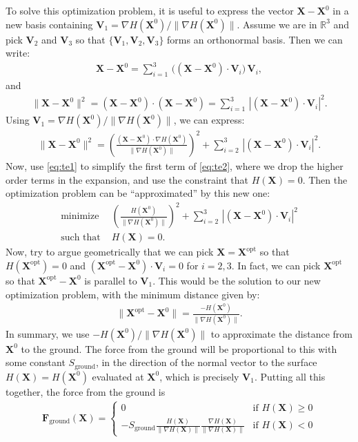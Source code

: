 \documentclass[10pt]{article}
\newcommand{\bs}[1]{{\boldsymbol #1}}
\begin{document}
To solve this optimization problem, it is useful to express the vector ${\bs X} - {\bs X}^0$ in a new basis containing ${\bs V}_1 = \nabla H({\bs X}^0) / \|  \nabla H({\bs X}^0) \|$.  Assume we are in $\mathbb{R}^3$ and pick ${\bs V}_2$ and ${\bs V}_3$ so that $\{ {\bs V}_1,  {\bs V}_2,  {\bs V}_3 \}$ forms an orthonormal basis.  Then we can write:
\begin{align*}
{\bs X} - {\bs X}^0 = \sum_{i=1}^3 \, \Big(({\bs X} - {\bs X}^0) \cdot {\bs V}_i \Big) \, {\bs V}_i, 
\end{align*} 
and
\textbf{\begin{align*}
\|{\bs X} - {\bs X}^0\|^2 = ({\bs X} - {\bs X}^0) \cdot ({\bs X} - {\bs X}^0) = \sum_{i=1}^3 \, |({\bs X} - {\bs X}^0) \cdot {\bs V}_i|^2. 
\end{align*} }
Using ${\bs V}_1 = \nabla H({\bs X}^0) / \|  \nabla H({\bs X}^0) \|$, we can express:
\begin{align}
\label{eq:te2}
\|{\bs X} - {\bs X}^0\|^2 = \left(\frac{({\bs X} - {\bs X}^0) \cdot \nabla H({\bs X}^0)}{\|  \nabla H({\bs X}^0) \|} \right)^2 +  \sum_{i=2}^3 \, |({\bs X} - {\bs X}^0) \cdot {\bs V}_i|^2. 
\end{align} 
Now, use \eqref{eq:te1} to simplify the first term of \eqref{eq:te2}, where we drop the higher order terms in the expansion, and use the constraint that $H({\bs X}) = 0$.  Then the optimization problem can be ``approximated'' by this new one:
\begin{align*}
\text{minimize }&\left(\frac{H({\bs X}^0)}{\|  \nabla H({\bs X}^0) \|}\right)^2 +  \sum_{i=2}^3 \, |({\bs X} - {\bs X}^0) \cdot {\bs V}_i|^2 \\
\text{such that }&H({\bs X}) = 0.
\end{align*} 
Now, try to argue geometrically that we can pick ${\bs X} = {\bs X}^\text{opt}$ so that $H({\bs X}^\text{opt}) = 0$ and $({\bs X}^\text{opt} - {\bs X}^0) \cdot {\bs V}_i = 0$ for $i = 2, 3$.  In fact, we can pick ${\bs X}^\text{opt}$ so that ${\bs X}^\text{opt} - {\bs X}^0$ is parallel to ${\bs V}_1$.  This would be the solution to our new optimization problem, with the minimum distance given by:
\begin{align*}
\| {\bs X}^\text{opt} - {\bs X}^0 \| = \frac{-H({\bs X}^0)}{\|  \nabla H({\bs X}^0) \|}.
\end{align*} 
In summary, we use $-H({\bs X}^0) /\|  \nabla H({\bs X}^0)\|$ to approximate the distance from ${\bs X}^0$ to the ground.  The force from the ground will be proportional to this with some constant $S_\text{ground}$, in the direction of the normal vector to the surface $H({\bs X}) = H({\bs X}^0)$ evaluated at ${\bs X}^0$, which is precisely ${\bs V}_1$.  Putting all this together, the force from the ground is
\begin{align*}
{\bs F}_\text{ground}({\bs X}) = 
\begin{cases}
0 & \text{if }H({\bs X}) \geq 0 \\
-S_\text{ground} \frac{H({\bs X})}{\|\nabla H({\bs X})\|} \frac{\nabla H({\bs X})}{\|\nabla H({\bs X})\|} & \text{if }H({\bs X}) < 0
\end{cases}
\end{align*}
\end{document}
